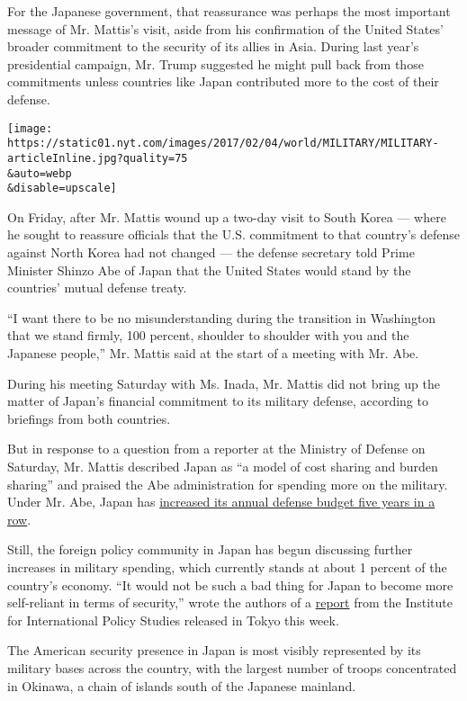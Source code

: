 For the Japanese government, that reassurance was perhaps the most
important message of Mr. Mattis's visit, aside from his confirmation of
the United States' broader commitment to the security of its allies in
Asia. During last year's presidential campaign, Mr. Trump suggested he
might pull back from those commitments unless countries like Japan
contributed more to the cost of their defense.

\texttt{[image: https://static01.nyt.com/images/2017/02/04/world/MILITARY/MILITARY-articleInline.jpg?quality=75\\\&auto=webp\\\&disable=upscale]}

On Friday, after Mr. Mattis wound up a two-day visit to South Korea ---
where he sought to reassure officials that the U.S. commitment to that
country's defense against North Korea had not changed --- the defense
secretary told Prime Minister Shinzo Abe of Japan that the United States
would stand by the countries' mutual defense treaty.

``I want there to be no misunderstanding during the transition in
Washington that we stand firmly, 100 percent, shoulder to shoulder with
you and the Japanese people,'' Mr. Mattis said at the start of a meeting
with Mr. Abe.

During his meeting Saturday with Ms. Inada, Mr. Mattis did not bring up
the matter of Japan's financial commitment to its military defense,
according to briefings from both countries.

But in response to a question from a reporter at the Ministry of Defense
on Saturday, Mr. Mattis described Japan as ``a model of cost sharing and
burden sharing'' and praised the Abe administration for spending more on
the military. Under Mr. Abe, Japan has
\href{https://www.nytimes.com/2016/08/31/world/asia/japan-defense-military-budget-shinzo-abe.html}{increased
its annual defense budget five years in a row}.

Still, the foreign policy community in Japan has begun discussing
further increases in military spending, which currently stands at about
1 percent of the country's economy. ``It would not be such a bad thing
for Japan to become more self-reliant in terms of security,'' wrote the
authors of a
\href{http://www.iips.org/en/research/usjr2017en.pdf}{report} from the
Institute for International Policy Studies released in Tokyo this week.

The American security presence in Japan is most visibly represented by
its military bases across the country, with the largest number of troops
concentrated in Okinawa, a chain of islands south of the Japanese
mainland.

